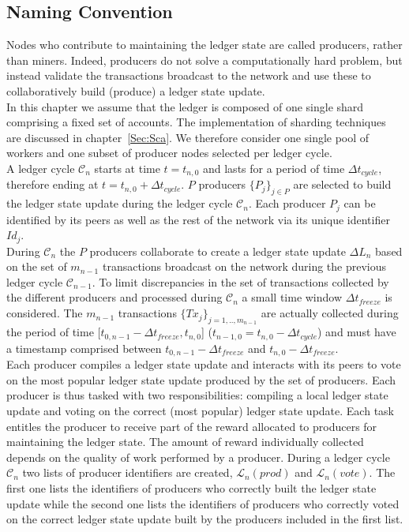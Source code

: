 \subsection{Naming Convention}

Nodes who contribute to maintaining the ledger state are called producers, rather than miners. Indeed, producers do not solve a computationally hard problem, but instead validate the transactions broadcast to the network and use these to collaboratively build (produce) a ledger state update. \\

In this chapter we assume that the ledger is composed of one single shard comprising a fixed set of accounts. The implementation of sharding techniques are discussed in chapter~\ref{Sec:Sca}. We therefore consider one single pool of workers and one subset of producer nodes selected per ledger cycle. \\

A ledger cycle $\mathcal{C}_n$ starts at time $t = t_{n,0}$ and lasts for a period of time $\Delta t_{cycle}$, therefore ending at $t = t_{n,0}+ \Delta t_{cycle}$. $P$ producers $\{P_j\}_{j\in P}$ are selected to build the ledger state update during the ledger cycle $\mathcal{C}_n$. Each producer $P_j$ can be identified by its peers as well as the rest of the network via its unique identifier $Id_j$.\\

During $\mathcal{C}_n$ the $P$ producers collaborate to create a ledger state update $\Delta L_{n}$ based on the set of $m_{n-1}$ transactions broadcast on the network during the previous ledger cycle $\mathcal{C}_{n-1}$. To limit discrepancies in the set of transactions collected by the different producers and processed during $\mathcal{C}_n$ a small time window $\Delta t_{freeze}$ is considered. The $m_{n-1}$ transactions $\{Tx_j\}_{j=1,..,m_{n-1}}$ are actually collected during the period of time [$t_{0,n-1} - \Delta t_{freeze}, t_{n,0}$] ($t_{n-1,0} = t_{n,0} - \Delta t_{cycle}$) and must have a timestamp comprised between $t_{0,n-1} - \Delta t_{freeze}$ and $t_{n,0} - \Delta t_{freeze}$.\\

Each producer compiles a ledger state update and interacts with its peers to vote on the most popular ledger state update produced by the set of producers. Each producer is thus tasked with two responsibilities: compiling a local ledger state update and voting on the correct (most popular) ledger state update. Each task entitles the producer to receive part of the reward allocated to producers for maintaining the ledger state. The amount of reward individually collected depends on the quality of work performed by a producer. During a ledger cycle $\mathcal{C}_n$ two lists of producer identifiers are created, $\mathcal{L}_n(prod)$ and $\mathcal{L}_n(vote)$. The first one lists the identifiers of producers who correctly built the ledger state update while the second one lists the identifiers of producers who correctly voted on the correct ledger state update built by the producers included in the first list.\\


